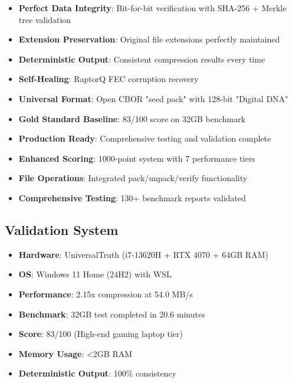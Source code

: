 \documentclass[12pt,a4paper]{article}
\begin{document}
\begin{itemize}
    \item \textbf{Perfect Data Integrity}: Bit-for-bit verification with SHA-256 + Merkle tree validation
    \item \textbf{Extension Preservation}: Original file extensions perfectly maintained
    \item \textbf{Deterministic Output}: Consistent compression results every time
    \item \textbf{Self-Healing}: RaptorQ FEC corruption recovery
    \item \textbf{Universal Format}: Open CBOR "seed pack" with 128-bit "Digital DNA"
    \item \textbf{Gold Standard Baseline}: 83/100 score on 32GB benchmark
    \item \textbf{Production Ready}: Comprehensive testing and validation complete
    \item \textbf{Enhanced Scoring}: 1000-point system with 7 performance tiers
    \item \textbf{File Operations}: Integrated pack/unpack/verify functionality
    \item \textbf{Comprehensive Testing}: 130+ benchmark reports validated
\end{itemize}

\subsection{Validation System}

\begin{itemize}
    \item \textbf{Hardware}: UniversalTruth (i7-13620H + RTX 4070 + 64GB RAM)
    \item \textbf{OS}: Windows 11 Home (24H2) with WSL
    \item \textbf{Performance}: 2.15x compression at 54.0 MB/s
    \item \textbf{Benchmark}: 32GB test completed in 20.6 minutes
    \item \textbf{Score}: 83/100 (High-end gaming laptop tier)
    \item \textbf{Memory Usage}: <2GB RAM
    \item \textbf{Deterministic Output}: 100\% consistency
\end{itemize}
\end{document}
